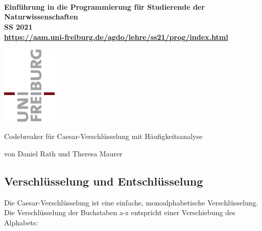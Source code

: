 \documentclass[ngerman,12pt]{article}
\renewcommand{\title}[1]{\par\vspace{5mm}\centerline{\Large #1}}
\newcommand{\subtitle}[1]{\par\vspace{1mm}\centerline{\footnotesize #1}\par}
\begin{document}

\setlength{\textwidth}{16.5cm}
\setlength{\textheight}{22cm}
\setlength{\topmargin}{0cm}
\setlength{\oddsidemargin}{-0.3cm}
\setlength{\evensidemargin}{0cm}
\vspace*{-20mm}

\parbox{20mm}{
~\\[0mm]
~\\[0mm]
~\\[-5mm]} %
\parbox{120mm}{\vspace*{1mm}\begin{center}\large\bf%
Einführung in die Programmierung für Studierende der Naturwissenschaften\\[0mm]
\hspace{5mm} SS 2021\\[0mm]
{\footnotesize\rm \url{https://aam.uni-freiburg.de/agdo/lehre/ss21/prog/index.html}}%
\end{center}}
\par\vspace{-5mm}
\vspace*{2mm}
\raisebox{1.19cm}{%
\textcolor{freiburg-gray}{\rule{0.885\textwidth}{1.1mm}}}
\par\vspace*{-37.84mm}
\hspace*{\fill}\includegraphics[width=74pt,height=107pt]{Uni_Logo.png}
\par\vspace{-5mm}

\bigskip

\title{Codebreaker für Caesar-Verschlüsselung mit Häufigkeitsanalyse}
\subtitle{von Daniel Rath und Theresa Maurer}
\renewcommand{\baselinestretch}{1.1}\normalsize

\bigskip
\subsection*{Verschlüsselung und Entschlüsselung}
Die Caesar-Verschlüsselung ist eine einfache, monoalphabetische Verschlüsselung. Die Verschlüsselung der Buchstaben a-z entspricht einer Verschiebung des Alphabets:
\end{document}
